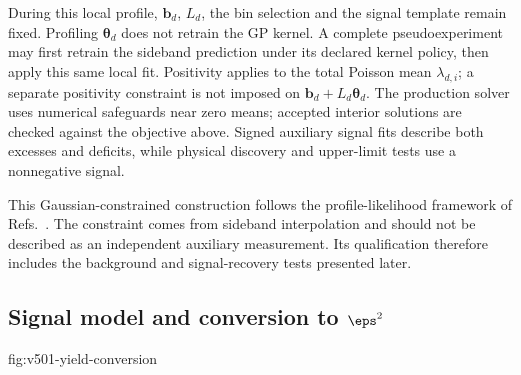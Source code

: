 During this local profile, $\bm b_d$, $L_d$, the bin selection and the signal
template remain fixed. Profiling $\bm\theta_d$ does not retrain the GP kernel.
A complete pseudoexperiment may first retrain the sideband prediction under
its declared kernel policy, then apply this same local fit. Positivity
applies to the total Poisson mean $\lambda_{d,i}$; a separate positivity
constraint is not imposed on $\bm b_d+L_d\bm\theta_d$. The production solver
uses numerical safeguards near zero means; accepted interior solutions are
checked against the objective above. Signed auxiliary signal fits describe
both excesses and deficits, while physical discovery and upper-limit tests
use a nonnegative signal.

This Gaussian-constrained construction follows the profile-likelihood
framework of Refs.~\cite{HistFactory,Cowan2011,FrateGP2017}. The constraint
comes from sideband interpolation and should not be described as an
independent auxiliary measurement. Its qualification therefore includes the
background and signal-recovery tests presented later.

\subsection{Signal model and conversion to \texorpdfstring{$\eps^2$}{epsilon2}}
\label{sec:v501-signal-conversion}

{fig:v501-yield-conversion}


